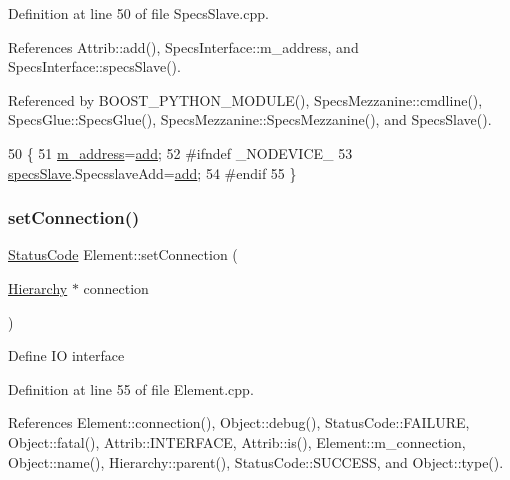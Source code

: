 Definition at line 50 of file Specs\+Slave.\+cpp.



References Attrib\+::add(), Specs\+Interface\+::m\+\_\+address, and Specs\+Interface\+::specs\+Slave().



Referenced by B\+O\+O\+S\+T\+\_\+\+P\+Y\+T\+H\+O\+N\+\_\+\+M\+O\+D\+U\+L\+E(), Specs\+Mezzanine\+::cmdline(), Specs\+Glue\+::\+Specs\+Glue(), Specs\+Mezzanine\+::\+Specs\+Mezzanine(), and Specs\+Slave().


\begin{DoxyCode}
50                                             \{
51   \hyperlink{classSpecsInterface_a4064da5ca6e0a172363967c4acc0b365}{m\_address}=\hyperlink{classAttrib_a235f773af19c900264a190b00a3b4ad7}{add};
52 \textcolor{preprocessor}{#ifndef \_NODEVICE\_
}
53   \hyperlink{classSpecsInterface_a13cf39bddfa8ba21d6e6aa78e78f0e4f}{specsSlave}.SpecsslaveAdd=\hyperlink{classAttrib_a235f773af19c900264a190b00a3b4ad7}{add};
54 \textcolor{preprocessor}{#endif
}
55 \}
\end{DoxyCode}
\mbox{\label{classElement_ab476b4b1df5954141ceb14f072433b89}} 
\subsubsection{\texorpdfstring{set\+Connection()}{setConnection()}}
{\footnotesize\ttfamily \hyperlink{classStatusCode}{Status\+Code} Element\+::set\+Connection (\begin{DoxyParamCaption}\item[{\hyperlink{classHierarchy}{Hierarchy} $\ast$}]{connection }\end{DoxyParamCaption})\hspace{0.3cm}{\ttfamily [inherited]}}

Define IO interface 

Definition at line 55 of file Element.\+cpp.



References Element\+::connection(), Object\+::debug(), Status\+Code\+::\+F\+A\+I\+L\+U\+RE, Object\+::fatal(), Attrib\+::\+I\+N\+T\+E\+R\+F\+A\+CE, Attrib\+::is(), Element\+::m\+\_\+connection, Object\+::name(), Hierarchy\+::parent(), Status\+Code\+::\+S\+U\+C\+C\+E\+SS, and Object\+::type().



